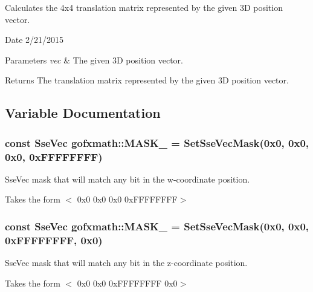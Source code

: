 Calculates the 4x4 translation matrix represented by the given 3\+D position vector. 

\begin{DoxyDate}{Date}
2/21/2015
\end{DoxyDate}

\begin{DoxyParams}{Parameters}
{\em vec} & The given 3\+D position vector.\\
\hline
\end{DoxyParams}
\begin{DoxyReturn}{Returns}
The translation matrix represented by the given 3\+D position vector. 
\end{DoxyReturn}


\subsection{Variable Documentation}
\hypertarget{namespacegofxmath_afec549b0968ef5d9ea00d1eb2deda70b}{}
\subsubsection[{M\+A\+S\+K\+\_\+0001}]{\setlength{\rightskip}{0pt plus 5cm}const {\bf Sse\+Vec} gofxmath\+::\+M\+A\+S\+K\+\_ = {\bf Set\+Sse\+Vec\+Mask}(0x0, 0x0, 0x0, 0x\+F\+F\+F\+F\+F\+F\+F\+F)}\label{namespacegofxmath_afec549b0968ef5d9ea00d1eb2deda70b}


Sse\+Vec mask that will match any bit in the w-\/coordinate position. 

Takes the form $<$ 0x0 0x0 0x0 0x\+F\+F\+F\+F\+F\+F\+F\+F$>$ \hypertarget{namespacegofxmath_ad431727ef9389a0240a56b9fa2f99a14}{}
\subsubsection[{M\+A\+S\+K\+\_\+0010}]{\setlength{\rightskip}{0pt plus 5cm}const {\bf Sse\+Vec} gofxmath\+::\+M\+A\+S\+K\+\_ = {\bf Set\+Sse\+Vec\+Mask}(0x0, 0x0, 0x\+F\+F\+F\+F\+F\+F\+F\+F, 0x0)}\label{namespacegofxmath_ad431727ef9389a0240a56b9fa2f99a14}


Sse\+Vec mask that will match any bit in the z-\/coordinate position. 

Takes the form $<$ 0x0 0x0 0x\+F\+F\+F\+F\+F\+F\+F\+F 0x0$>$ \hypertarget{namespacegofxmath_ab4d2ad1ff23d4e35a2cb19a3be6dbe19}{}
